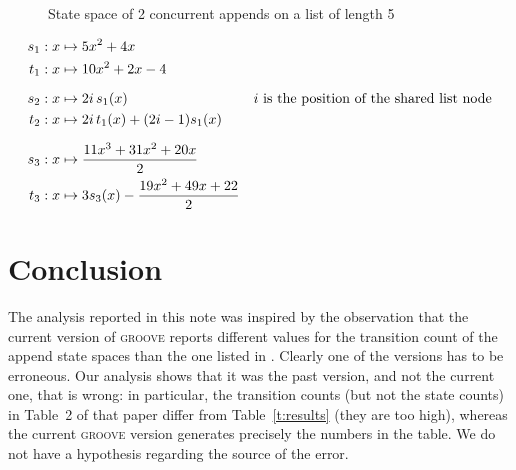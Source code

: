\documentclass[a4paper]{article}
\newcommand{\GROOVE}{\textsc{groove}\xspace}
\newcommand{\append}{\textsf{append}\xspace}
\begin{document}
\begin{figure}
\centering
\scalebox{.3}{}
\caption{State space of 2 concurrent appends on a list of length 5}
\label{f:lts}
\end{figure}

\begin{align*}
s_1: x & \mapsto 5x^2 + 4x \\
t_1: x & \mapsto 10x^2 + 2x - 4 \\[\medskipamount]
s_2: x & \mapsto 2i\, s_1(x) 
       & i \mbox{ is the position of the shared list node} \\
t_2: x & \mapsto 2i\,t_1(x) + (2i-1)s_1(x) \\[\medskipamount]
s_3: x & \mapsto {11x^3 + 31x^2 + 20x \over 2} \\
t_3: x & \mapsto 3s_3(x) - {19x^2 + 49x + 22 \over 2}
\end{align*}

\section{Conclusion}

The analysis reported in this note was inspired by the observation that the
current version of \GROOVE reports different values for the transition count of
the \append state spaces than the one listed in \cite{SchmidtRenVar2004}.
Clearly one of the versions has to be erroneous. Our analysis shows that it was
the past version, and not the current one, that is wrong: in particular, the
transition counts (but not the state counts) in Table~2 of that paper differ
from Table~\ref{t:results} (they are too high), whereas the current \GROOVE
version generates precisely the numbers in the table. We do not have a
hypothesis regarding the source of the error.
%


\end{document}
